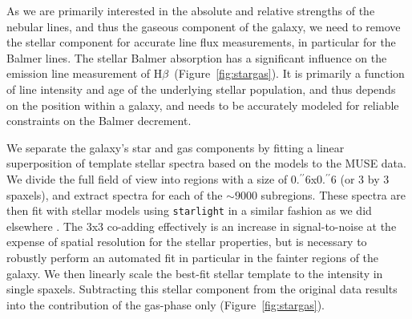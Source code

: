 \documentclass[traditabstract]{aa}
\newcommand{\farc}{\hbox{$.\!\!^{\prime\prime}$}}
\newcommand{\hb}{H$\beta$}
\begin{document}
As we are primarily interested in the absolute and relative strengths of the nebular lines, and thus the gaseous component of the galaxy, we need to remove the stellar component for accurate line flux measurements, in particular for the Balmer lines. The stellar Balmer absorption has a significant influence on the emission line measurement of \hb\, (Figure~\ref{fig:stargas}). It is primarily a function of line intensity and age of the underlying stellar population, and thus depends on the position within a galaxy, and needs to be accurately modeled for reliable constraints on the Balmer decrement.

We separate the galaxy's star and gas components by fitting a linear superposition of template stellar spectra based on the \citet{2003MNRAS.344.1000B} models to the MUSE data. We divide the full field of view into regions with a size of 0\farc{6}x0\farc{6} (or 3 by 3 spaxels), and extract spectra for each of the $\sim9000$ subregions. These spectra are then fit with stellar models using \texttt{starlight} \citep{2005MNRAS.358..363C, 2009RMxAC..35..127C} in a similar fashion as we did elsewhere \citep{2016MNRAS.455.4087G, 2016arXiv160703446K, 2016arXiv160900013P}. The 3x3 co-adding effectively is an increase in signal-to-noise at the expense of spatial resolution for the stellar properties, but is necessary to robustly perform an automated fit in particular in the fainter regions of the galaxy. We then linearly scale the best-fit stellar template to the intensity in single spaxels. Subtracting this stellar component from the original data results into the contribution of the gas-phase only (Figure~\ref{fig:stargas}).
\end{document}
